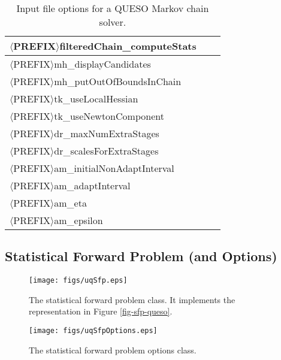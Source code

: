 \begin{table}[!h]
\begin{center}
\begin{tabular}{|l|c|c|}
\hline
$\langle$PREFIX$\rangle$filteredChain\_computeStats         &         &             \\
\hline
$\langle$PREFIX$\rangle$mh\_displayCandidates               &         &             \\
\hline
$\langle$PREFIX$\rangle$mh\_putOutOfBoundsInChain           &         &             \\
\hline
$\langle$PREFIX$\rangle$tk\_useLocalHessian                 &         &             \\
\hline
$\langle$PREFIX$\rangle$tk\_useNewtonComponent              &         &             \\
\hline
$\langle$PREFIX$\rangle$dr\_maxNumExtraStages               &         &             \\
\hline
$\langle$PREFIX$\rangle$dr\_scalesForExtraStages            &         &             \\
\hline
$\langle$PREFIX$\rangle$am\_initialNonAdaptInterval         &         &             \\
\hline
$\langle$PREFIX$\rangle$am\_adaptInterval                   &         &             \\
\hline
$\langle$PREFIX$\rangle$am\_eta                             &         &             \\
\hline
$\langle$PREFIX$\rangle$am\_epsilon                         &         &             \\
\hline
\end{tabular}
\end{center}
\caption{
Input file options for a QUESO Markov chain solver.
}
\label{tab-markov-options}
\end{table}

\clearpage
\subsection{Statistical Forward Problem (and Options)}

\begin{figure}[h!]
\centerline{
\texttt{[image: figs/uqSfp.eps]}
}
\caption{
The statistical forward problem class. It implements the representation in Figure \ref{fig-sfp-queso}.
}
\label{fig-sfp-class}
\end{figure}

\begin{figure}[h!]
\begin{center}
\texttt{[image: figs/uqSfpOptions.eps]}
\end{center}
\caption{
The statistical forward problem options class.
}
\label{fig-sfp-options-class}
\end{figure}


